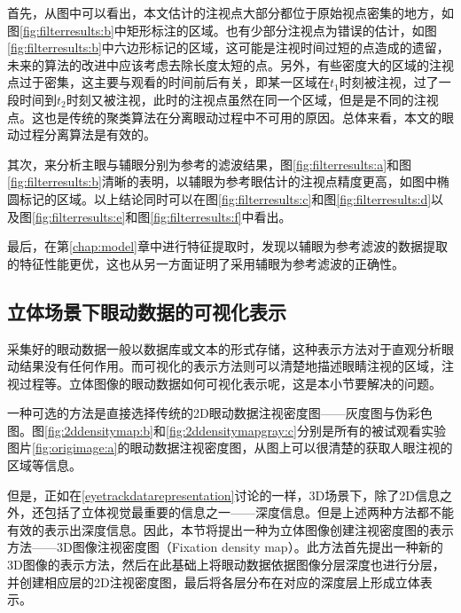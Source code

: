 首先，从图中可以看出，本文估计的注视点大部分都位于原始视点密集的地方，如图\ref{fig:filterresults:b}中矩形标注的区域。也有少部分注视点为错误的估计，如图\ref{fig:filterresults:b}中六边形标记的区域，这可能是注视时间过短的点造成的遗留，未来的算法的改进中应该考虑去除长度太短的点。另外，有些密度大的区域的注视点过于密集，这主要与观看的时间前后有关，即某一区域在$t_1$时刻被注视，过了一段时间到$t_2$时刻又被注视，此时的注视点虽然在同一个区域，但是是不同的注视点。这也是传统的聚类算法在分离眼动过程中不可用的原因。总体来看，本文的眼动过程分离算法是有效的。

其次，来分析主眼与辅眼分别为参考的滤波结果，图\ref{fig:filterresults:a}和图\ref{fig:filterresults:b}清晰的表明，以辅眼为参考眼估计的注视点精度更高，如图中椭圆标记的区域。以上结论同时可以在图\ref{fig:filterresults:c}和图\ref{fig:filterresults:d}以及图\ref{fig:filterresults:e}和图\ref{fig:filterresults:f}中看出。

最后，在第\ref{chap:model}章中进行特征提取时，发现以辅眼为参考滤波的数据提取的特征性能更优，这也从另一方面证明了采用辅眼为参考滤波的正确性。
\subsection{立体场景下眼动数据的可视化表示}
\label{sec:densitymap}
采集好的眼动数据一般以数据库或文本的形式存储，这种表示方法对于直观分析眼动结果没有任何作用。而可视化的表示方法则可以清楚地描述眼睛注视的区域，注视过程等。立体图像的眼动数据如何可视化表示呢，这是本小节要解决的问题。

一种可选的方法是直接选择传统的2D眼动数据注视密度图——灰度图与伪彩色图。图\ref{fig:2ddensitymap:b}和\ref{fig:2ddensitymapgray:c}分别是所有的被试观看实验图片\ref{fig:origimage:a}的眼动数据注视密度图，从图上可以很清楚的获取人眼注视的区域等信息。

但是，正如在\ref{eyetrackdatarepresentation}讨论的一样，3D场景下，除了2D信息之外，还包括了立体视觉最重要的信息之一——深度信息。但是上述两种方法都不能有效的表示出深度信息。因此，本节将提出一种为立体图像创建注视密度图的表示方法——3D图像注视密度图（Fixation density map）。此方法首先提出一种新的3D图像的表示方法，然后在此基础上将眼动数据依据图像分层深度也进行分层，并创建相应层的2D注视密度图，最后将各层分布在对应的深度层上形成立体表示。
\begin{figure}[!t]
  \centering
\end{figure}
